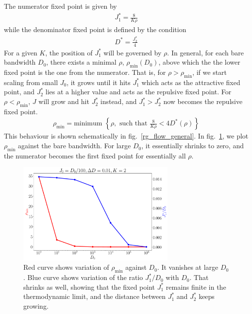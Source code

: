 \documentclass{revtex4-2}
\numberwithin{equation}{section}
\begin{document}
The numerator fixed point is given by
\begin{equation}\begin{aligned}
	J_1^* = \frac{8}{K \rho}
\end{aligned}\end{equation}
while the denominator fixed point is defined by the condition
\begin{equation}\begin{aligned}
	D^* = \frac{J_2^*}{4}
\end{aligned}\end{equation}
For a given \(K\), the position of \(J_1^*\) will be governed by \(\rho\). In general, for each bare bandwidth \(D_0\), there exists a minimal \(\rho\), $\rho_\text{min}(D_0)$, above which the the lower fixed point is the one from the numerator. That is, for \(\rho > \rho_\text{min}\), if we start scaling from small \(J_0\), it grows until it hits \(J_1^*\) which acts as the attractive fixed point, and \(J_2^*\) lies at a higher value and acts as the repulsive fixed point. For \(\rho < \rho_\text{min}\), \(J\) will grow and hit \(J_2^*\) instead, and \(J_1^* > J_2^*\) now becomes the repulsive fixed point.
\begin{equation}\begin{aligned}
	\rho_\text{min} = \text{minimum }\left\{\rho, \text{ such that } \frac{8}{K \rho} < 4 D^*(\rho)\right\}
\end{aligned}\end{equation}
This behaviour is shown schematically in fig.~\ref{rg_flow_general}. 
In fig.~\ref{rhomin_vs_D}, we plot \(\rho_\text{min}\) against the bare bandwidth. For large \(D_0\), it essentially shrinks to zero, and the numerator becomes the first fixed point for essentially all \(\rho\).
\begin{figure}[htpb]
	\centering
	\includegraphics[width=0.7\textwidth]{./rhomin_D.pdf}
	\caption{Red curve shows variation of \(\rho_\text{min}\) against \(D_0\). It vanishes at large \(D_0\). Blue curve shows variation of the ratio \(J_1^* / D_0\) with \(D_0\). That shrinks as well, showing that the fixed point \(J_1^*\) remains finite in the thermodynamic limit, and the distance between \(J_1^*\) and \(J_2^*\) keeps growing.}
	\label{rhomin_vs_D}
\end{figure}
\end{document}
